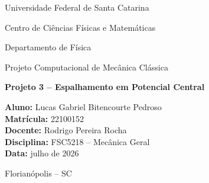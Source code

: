 \begin{titlepage}
    \centering
    {\large Universidade Federal de Santa Catarina\par}
    {\large Centro de Ci\^encias F\'isicas e Matem\'aticas\par}
    {\large Departamento de F\'isica\par}

    \vfill

    {\Large Projeto Computacional de Mec\^anica Cl\'assica\par}
    \vspace{0.4cm}
    {\LARGE\bfseries Projeto 3 -- Espalhamento em Potencial Central\par}

    \vfill

    \begin{flushleft}
        \textbf{Aluno:} Lucas Gabriel Bitencourte Pedroso \\
        \textbf{Matr\'icula:} 22100152 \\
        \textbf{Docente:} Rodrigo Pereira Rocha \\
        \textbf{Disciplina:} FSC5218 -- Mec\^anica Geral \\
        \textbf{Data:} julho de 2026
    \end{flushleft}

    \vfill
    Florian\'opolis -- SC
\end{titlepage}
